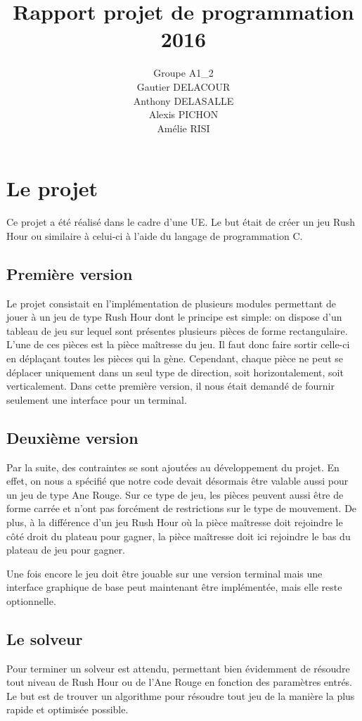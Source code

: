 \documentclass{report}
\title{Rapport projet de programmation 2016}
\author{Groupe A1\_2\\Gautier DELACOUR\\Anthony DELASALLE\\Alexis PICHON\\Amélie RISI}
\begin{document}
\maketitle
\tableofcontents

\chapter{Le projet}
Ce projet a été réalisé dans le cadre d'une UE. Le but était de créer un jeu Rush Hour ou similaire à celui-ci à l'aide du langage de programmation C. 
\section{Première version}
Le projet consistait en l'implémentation de plusieurs modules permettant de jouer à un jeu de type Rush Hour dont le principe est simple: on dispose d'un tableau de jeu sur lequel sont présentes plusieurs pièces de forme rectangulaire. L'une de ces pièces est la pièce maîtresse du jeu. Il faut donc faire sortir celle-ci en déplaçant toutes les pièces qui la gène. Cependant, chaque pièce ne peut se déplacer uniquement dans un seul type de direction, soit horizontalement, soit verticalement.
Dans cette première version, il nous était demandé de fournir seulement une interface pour un terminal.

\section{Deuxième version}
Par la suite, des contraintes se sont ajoutées au développement du projet. En effet, on nous a spécifié que notre code devait désormais être valable aussi pour un jeu de type Ane Rouge. Sur ce type de jeu, les pièces peuvent aussi être de forme carrée et n'ont pas forcément de restrictions sur le type de mouvement. De plus, à la différence d'un jeu Rush Hour où la pièce maîtresse doit rejoindre le côté droit du plateau pour gagner, la pièce maîtresse doit ici rejoindre le bas du plateau de jeu pour gagner.

Une fois encore le jeu doit être jouable sur une version terminal mais une interface graphique de base peut maintenant être implémentée, mais elle reste optionnelle.


\section{Le solveur}
Pour terminer un solveur est attendu, permettant bien évidemment de résoudre tout niveau de Rush Hour ou de l'Ane Rouge en fonction des paramètres entrés. Le but est de trouver un algorithme pour résoudre tout jeu de la manière la plus rapide et optimisée possible.
\end{document}
